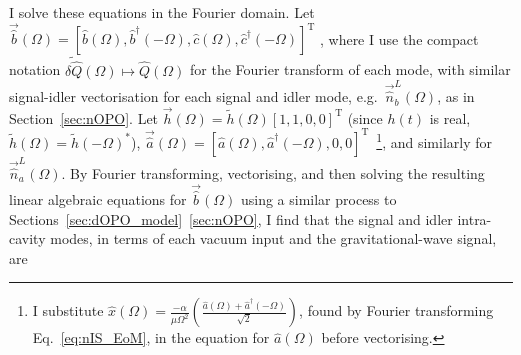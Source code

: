 I solve these equations in the Fourier domain. Let $\vec{\hat b}(\Omega)=[\hat b(\Omega), \hat b^\dag(-\Omega), \hat c(\Omega), \hat c^\dag(-\Omega)]^\text{T}$ , where I use the compact notation $\tilde{\delta\hat{Q}}(\Omega)\mapsto\hat{Q}(\Omega)$ for the Fourier transform of each mode, with similar signal-idler vectorisation for each signal and idler mode, e.g.\ $\vec{\hat n}^L_b(\Omega)$, as in Section~\ref{sec:nOPO}. Let $\vec h(\Omega)=\tilde h(\Omega) [1,1,0,0]^\text{T}$ (since $h(t)$ is real, $\tilde h(\Omega)=\tilde h(-\Omega)^*$), $\vec{\hat a}(\Omega)=[\hat a(\Omega), \hat a^\dag(-\Omega),0,0]^\text{T}$~\footnote{I substitute $\hat x(\Omega) = \frac{-\alpha}{\mu\Omega^2}\left(\frac{\hat{a}(\Omega)+\hat{a}^\dag(-\Omega)}{\sqrt{2}}\right)$, found by Fourier transforming Eq.~\ref{eq:nIS_EoM}, in the equation for $\hat a(\Omega)$ before vectorising.}, and similarly for $\vec{\hat n}^L_a(\Omega)$.
By Fourier transforming, vectorising, and then solving the resulting linear algebraic equations for $\vec{\hat b}(\Omega)$ using a similar process to Sections~\ref{sec:dOPO_model}~\ref{sec:nOPO}, I find that the signal and idler intra-cavity modes, in terms of each vacuum input and the gravitational-wave signal, are 
